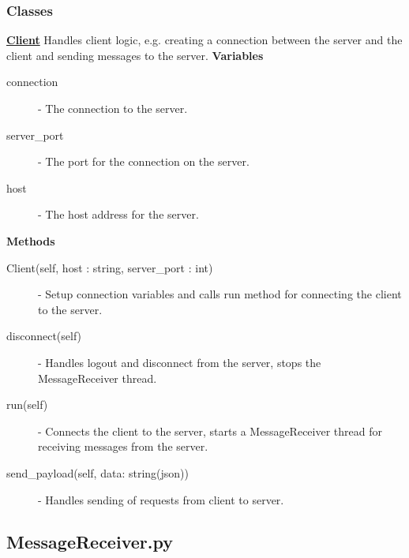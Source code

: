 \documentclass[a4paper, 12pt]{article}
\begin{document}
        \subsubsection{Classes}
            \textbf{\underline{Client}}
            \newline
            \newline
                Handles client logic, e.g. creating a connection between the server and the client and sending messages to the server.
                \newline
                \newline
                \textbf{Variables}
                    \begin{description}
                        \item[connection] - The connection to the server.
                        \item[server\_port] - The port for the connection on the server.
                        \item[host] - The host address for the server.
                    \end{description}
                \textbf{Methods}
                    \begin{description}
                        \item[Client(self, host : string, server\_port : int)] - Setup connection variables and calls run method for connecting the client to the server.
                        \item[disconnect(self)] - Handles logout and disconnect from the server, stops the MessageReceiver thread.
                        \item[run(self)] - Connects the client to the server, starts a MessageReceiver thread for receiving messages from the server.
                        \item[send\_payload(self, data: string(json))] - Handles sending of requests from client to server.
                    \end{description}
    \subsection{MessageReceiver.py}
\end{document}
